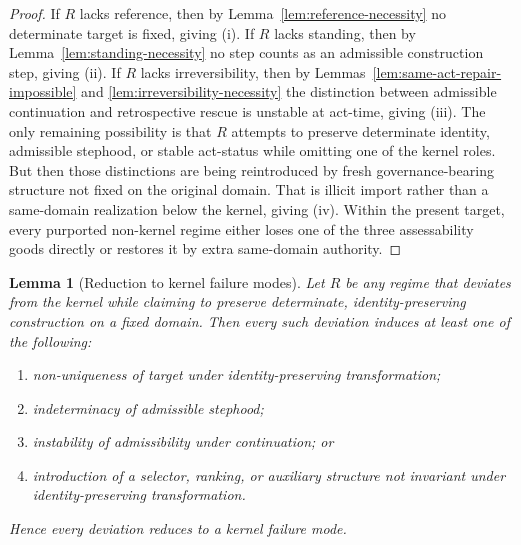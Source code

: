 \documentclass[11pt]{article}
\newtheorem{lemma}[theorem]{Lemma}
\theoremstyle{definition}
\theoremstyle{remark}
\begin{document}
\begin{proof}
If $R$ lacks reference, then by Lemma~\ref{lem:reference-necessity} no determinate target is fixed, giving (i). If $R$ lacks standing, then by Lemma~\ref{lem:standing-necessity} no step counts as an admissible construction step, giving (ii). If $R$ lacks irreversibility, then by Lemmas~\ref{lem:same-act-repair-impossible} and \ref{lem:irreversibility-necessity} the distinction between admissible continuation and retrospective rescue is unstable at act-time, giving (iii). The only remaining possibility is that $R$ attempts to preserve determinate identity, admissible stephood, or stable act-status while omitting one of the kernel roles. But then those distinctions are being reintroduced by fresh governance-bearing structure not fixed on the original domain. That is illicit import rather than a same-domain realization below the kernel, giving (iv). Within the present target, every purported non-kernel regime either loses one of the three assessability goods directly or restores it by extra same-domain authority.
\end{proof}

\begin{lemma}[Reduction to kernel failure modes]\label{lem:reduction-kernel-failure}
Let $R$ be any regime that deviates from the kernel while claiming to preserve determinate, identity-preserving construction on a fixed domain. Then every such deviation induces at least one of the following:
\begin{enumerate}[label=(\roman*)]
\item non-uniqueness of target under identity-preserving transformation;
\item indeterminacy of admissible stephood;
\item instability of admissibility under continuation; or
\item introduction of a selector, ranking, or auxiliary structure not invariant under identity-preserving transformation.
\end{enumerate}
Hence every deviation reduces to a kernel failure mode.
\end{lemma}
\end{document}
